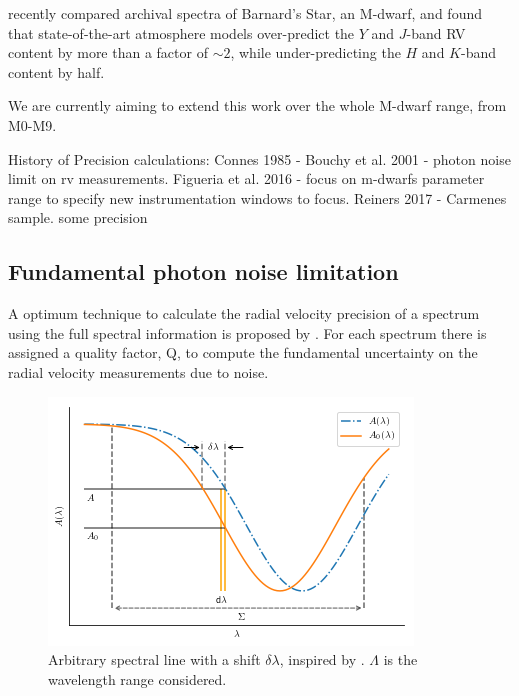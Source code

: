 \citet{artigau_optical_2018} recently compared archival spectra of Barnard's Star, an M-dwarf, and found that state-of-the-art atmosphere models over-predict the $Y$ and $J$-band RV content by more than a factor of $\sim$$2$, while under-predicting the $H$ and $K$-band content by half.

We are currently aiming to extend this work over the whole M-dwarf range, from M0-M9.


History of Precision calculations:
Connes 1985 -
Bouchy et al. 2001  - photon noise limit on rv measurements.   
Figueria et al. 2016 - focus on m-dwarfs parameter range to specify new instrumentation windows to focus.
Reiners 2017 -  Carmenes sample. some precision



\subsection{Fundamental photon noise limitation}
A optimum technique to calculate the radial velocity precision of a spectrum using the full spectral information is proposed by \citet{Connes1985}. For each spectrum there is assigned a quality factor, Q, to compute the fundamental uncertainty on the radial velocity measurements due to noise. 

\begin{figure}
    \centering
    \includegraphics[width=0.7\linewidth]{figures/precision_derivation.png}
    \caption{Arbitrary spectral line with a shift $\delta \lambda$, inspired by \citet{Connes1985}.  \(\Lambda\) is the wavelength range considered.}
    \label{fig:precisionderivation}
\end{figure}

